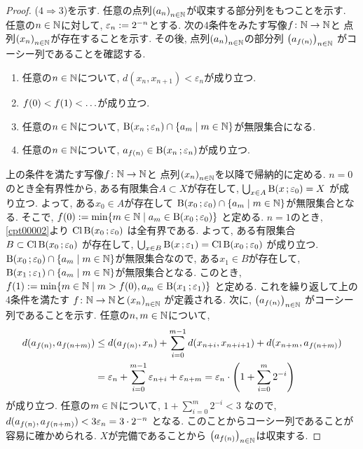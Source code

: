 \documentclass[uplatex, dvipdfmx, a4paper, 12pt, class=jsbook, crop=false]{standalone}
\begin{document}
\begin{proof}
	(\(4 \Longrightarrow 3\))を示す.
	任意の点列\( \lrparen{a_n}_{n \in \N} \)が収束する部分列をもつことを示す.
	任意の\( n \in \mathbb{N} \)に対して,
	\( \varepsilon_n \mathrel{:=} 2^{-n} \)とする.
	次の4条件をみたす写像\( f\colon\mathbb{N}\to\mathbb{N} \)と
	点列\( \lrparen{x_n}_{n \in \N} \)が存在することを示す.
	その後, 点列\( \lrparen{a_n}_{n \in \N} \)の部分列
	\( \lrparen{a_{\mappt{f}{n}}}_{n \in \N} \)
	がコーシー列であることを確認する.
	\begin{enumerate}
		\item 任意の\( n \in \mathbb{N} \)について,
		\( d(x_n, x_{n+1}) < \varepsilon_n \)が成り立つ.
		\item \( \mappt{f}{0} < \mappt{f}{1} < \ldots \)が成り立つ.
		\item 任意の\( n \in \mathbb{N} \)について,
		\( \topball{x_n}{\varepsilon_n} \cap
		\setcomp{a_m}{m \in \N} \)が無限集合になる.
		\item 任意の\( n \in \mathbb{N} \)について,
		\( a_{\mappt{f}{n}} \in \topball{x_n}{\varepsilon_n} \)が成り立つ.
	\end{enumerate}
	上の条件を満たす写像\( f\colon\mathbb{N}\to\mathbb{N} \)と
	点列\( \lrparen{x_n}_{n \in \N} \)を以降で帰納的に定める.
	\( n = 0 \)のとき全有界性から,
	ある有限集合\( A \subset X \)が存在して,
	\( \bigcup_{x \in A} \topball{x}{\varepsilon_0} = X \)
	が成り立つ.
	よって, ある\( x_0 \in A \)が存在して
	\( \topball{x_0}{\varepsilon_0} \cap
	\setcomp{a_m}{m \in \N} \)が無限集合となる.
	そこで, \( \mappt{f}{0} \defeq
	\min \setcomp{m \in \N}{a_m \in \topball{x_0}{\varepsilon_0}} \)
	と定める.
	\( n = 1 \)のとき, \cref{cpt00002}より
	\( \topcl \topball{x_0}{\varepsilon_0} \)
	は全有界である.
	よって, ある有限集合
	\( B \subset \topcl \topball{x_0}{\varepsilon_0} \)
	が存在して,
	\( \bigcup_{x \in B} \topball{x}{\varepsilon_1}
	= \topcl \topball{x_0}{\varepsilon_0} \)
	が成り立つ.
	\( \topball{x_0}{\varepsilon_0} \cap
	\setcomp{a_m}{m \in \N} \)が無限集合なので,
	ある\( x_1 \in B \)が存在して,
	\( \topball{x_1}{\varepsilon_1} \cap
	\setcomp{a_m}{m \in \N} \)が無限集合となる.
	このとき,
	\( \mappt{f}{1} \defeq
	\min \setcomp{m \in \N}{m > \mappt{f}{0},
	a_m \in \topball{x_1}{\varepsilon_1}} \)
	と定める.
	これを繰り返して上の4条件を満たす
	\( f\colon\mathbb{N}\to\mathbb{N} \)と\( \lrparen{x_n}_{n \in \N} \)
	が定義される.
	次に, \( \lrparen{a_{\mappt{f}{n}}}_{n \in \N} \)
	がコーシー列であることを示す.
	任意の\( n, m \in \mathbb{N} \)について,
	\begin{align*}
	d(a_{\mappt{f}{n}}, a_{\mappt{f}{n+m}})
	& \leq d(a_{\mappt{f}{n}}, x_n)
	+ \sum_{i=0}^{m-1} d(x_{n+i}, x_{n+i+1})
	+ d(x_{n+m}, a_{\mappt{f}{n+m}}) \\
	& = \varepsilon_n
	+ \sum_{i=0}^{m-1} \varepsilon_{n+i}
	+ \varepsilon_{n+m}
	= \varepsilon_n \cdot \lrparen{1 + \sum_{i=0}^{m}2^{-i}}
	\end{align*}
	が成り立つ.
	任意の\( m \in \mathbb{N} \)について,
	\( 1 + \sum_{i=0}^{m}2^{-i} < 3 \)
	なので,
	\( d(a_{\mappt{f}{n}}, a_{\mappt{f}{n+m}})
	< 3\varepsilon_n = 3\cdot 2^{-n} \)
	となる.
	このことからコーシー列であることが容易に確かめられる.
	\( X \)が完備であることから
	\( \lrparen{a_{\mappt{f}{n}}}_{n \in \N} \)は収束する.


\end{proof}
\end{document}
